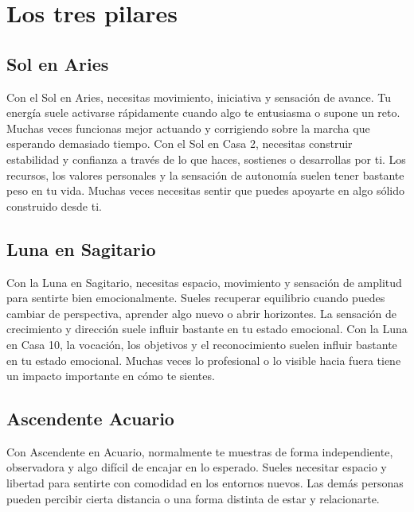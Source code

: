 \documentclass[11pt,a4paper]{article}
\begin{document}
\section{Los tres pilares}

\subsection{Sol en Aries}

Con el Sol en Aries, necesitas movimiento, iniciativa y sensación de avance. Tu energía suele activarse rápidamente cuando algo te entusiasma o supone un reto. Muchas veces funcionas mejor actuando y corrigiendo sobre la marcha que esperando demasiado tiempo. Con el Sol en Casa 2, necesitas construir estabilidad y confianza a través de lo que haces, sostienes o desarrollas por ti. Los recursos, los valores personales y la sensación de autonomía suelen tener bastante peso en tu vida. Muchas veces necesitas sentir que puedes apoyarte en algo sólido construido desde ti.

\vspace{0.8cm}

\subsection{Luna en Sagitario}

Con la Luna en Sagitario, necesitas espacio, movimiento y sensación de amplitud para sentirte bien emocionalmente. Sueles recuperar equilibrio cuando puedes cambiar de perspectiva, aprender algo nuevo o abrir horizontes. La sensación de crecimiento y dirección suele influir bastante en tu estado emocional. Con la Luna en Casa 10, la vocación, los objetivos y el reconocimiento suelen influir bastante en tu estado emocional. Muchas veces lo profesional o lo visible hacia fuera tiene un impacto importante en cómo te sientes.

\vspace{0.8cm}

\subsection{Ascendente Acuario}

Con Ascendente en Acuario, normalmente te muestras de forma independiente, observadora y algo difícil de encajar en lo esperado. Sueles necesitar espacio y libertad para sentirte con comodidad en los entornos nuevos. Las demás personas pueden percibir cierta distancia o una forma distinta de estar y relacionarte.
\end{document}
